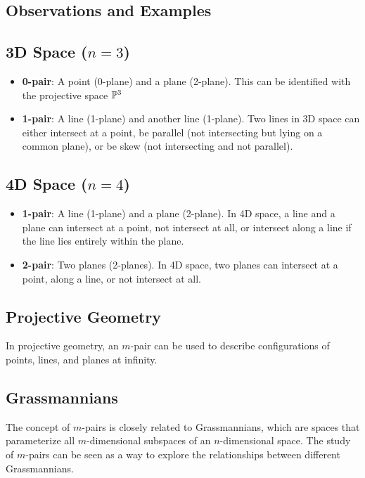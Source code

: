 \subsection{Observations and Examples}
\subsection*{3D Space ($n = 3 $)}
\begin{itemize}
    \item \textbf{0-pair}: A point (0-plane) and a plane (2-plane). This can be identified with the projective space $\mathbb{P}^3$
    \item \textbf{1-pair}: A line (1-plane) and another line (1-plane). Two lines in 3D space can either intersect at a point, be parallel (not intersecting but lying on a common plane), or be skew (not intersecting and not parallel).
\end{itemize}

\subsection*{4D Space ($n = 4 $)}
\begin{itemize}
    \item \textbf{1-pair}: A line (1-plane) and a plane (2-plane). In 4D space, a line and a plane can intersect at a point, not intersect at all, or intersect along a line if the line lies entirely within the plane.
    \item \textbf{2-pair}: Two planes (2-planes). In 4D space, two planes can intersect at a point, along a line, or not intersect at all.
\end{itemize}

\subsection*{Projective Geometry}
In projective geometry, an $m $-pair can be used to describe configurations of points, lines, and planes at infinity. 

\subsection*{Grassmannians}
The concept of $m $-pairs is closely related to Grassmannians, which are spaces that parameterize all $m $-dimensional subspaces of an $n$-dimensional space. The study of $m $-pairs can be seen as a way to explore the relationships between different Grassmannians.

